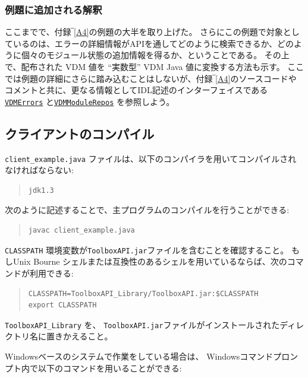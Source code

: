 \documentclass[\pformat,12pt]{jarticle}
\newcommand{\VDMErrors}{\hyperlink{interface.VDMErrors}{VDMErrors}}
\newcommand{\VDMModuleRepos}{\hyperlink{interface.VDMModuleRepos}{VDMModuleRepos}}
\begin{document}
\subsubsection{例題に追加される解釈}

ここまでで、付録‾\ref{A4}の例題の大半を取り上げた。
さらにこの例題で対象としているのは、エラーの詳細情報がAPIを通してどのように検索できるか、どのように個々のモジュール状態の追加情報を得るか、ということである。
その上で、配布された VDM 値を ``実数型'' VDM Java 値に変換する方法も示す。
 ここでは例題の詳細にさらに踏み込むことはしないが、付録‾\ref{A4}のソースコードやコメントと共に、更なる情報としてIDL記述のインターフェイスである {\tt \VDMErrors} と{\tt \VDMModuleRepos} を参照しよう。

\subsection{クライアントのコンパイル}

{\tt client\_example.java} ファイルは、以下のコンパイラを用いてコンパイルされなければならない:

\begin{quote}
\begin{verbatim}
jdk1.3
\end{verbatim}
\end{quote}

次のように記述することで、主プログラムのコンパイルを行うことができる:

\begin{quote}
\begin{verbatim}
javac client_example.java
\end{verbatim}  
\end{quote}

{\tt CLASSPATH} 環境変数が{\tt ToolboxAPI.jar}ファイルを含むことを確認すること。
もしUnix Bourne シェルまたは互換性のあるシェルを用いているならば、次のコマンドが利用できる:

\begin{quote}
\begin{verbatim}
CLASSPATH=ToolboxAPI_Library/ToolboxAPI.jar:$CLASSPATH
export CLASSPATH
\end{verbatim}  %
\end{quote}

{\tt ToolboxAPI\_Library} を、 {\tt ToolboxAPI.jar}ファイルがインストールされたディレクトリ名に置きかえること。

Windowsベースのシステムで作業をしている場合は、 Windowsコマンドプロンプト内で以下のコマンドを用いることができる: 
\end{document}
